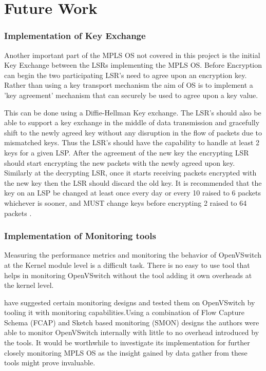 \chapter{Future Work}
\subsection*{Implementation of Key Exchange}
Another important part of the MPLS OS not covered in this project is the initial Key Exchange between the LSRs implementing the MPLS OS. Before Encryption can begin the two participating LSR's need to agree upon an encryption key. Rather than using a key transport mechanism the aim of OS is to implement a 'key agreement' mechanism that can securely be used to agree upon a key value.

This can be done using a Diffie-Hellman Key exchange. The LSR's should also be able to  support a key exchange in the middle of data transmission and gracefully shift to the newly agreed key without any disruption in the flow of packets due to mismatched keys. Thus the LSR's should have the capability to handle at least 2 keys for a given LSP. After the agreement of the new key the encrypting LSR should start encrypting the new packets with the newly agreed upon key. Similarly at the decrypting LSR, once it starts receiving packets encrypted with the new key then the LSR should discard the old key. It is recommended that the key on an LSP be changed at least once every day or every 10 raised to 6 packets whichever is sooner, and MUST change keys before encrypting 2 raised to 64 packets \cite{mpls-os-internet-draft}.


\subsection*{Implementation of Monitoring tools}
Measuring the performance metrics and monitoring the behavior of OpenVSwitch at the Kernel module level is a difficult task. There is no easy to use tool that helps in monitoring OpenVSwitch without the tool adding it own overheads at the kernel level.

\cite{zha2018instrumenting} have suggested certain monitoring designs and tested them  on OpenVSwitch by tooling it with monitoring capabilities.Using a combination of Flow Capture Schema (FCAP) and Sketch based monitoring (SMON) designs the authors were able to monitor OpenVSwitch internally with little to no overhead introduced by the tools. It would be worthwhile to investigate its implementation for further closely monitoring MPLS OS as the insight gained by data gather from these tools might prove invaluable. 


